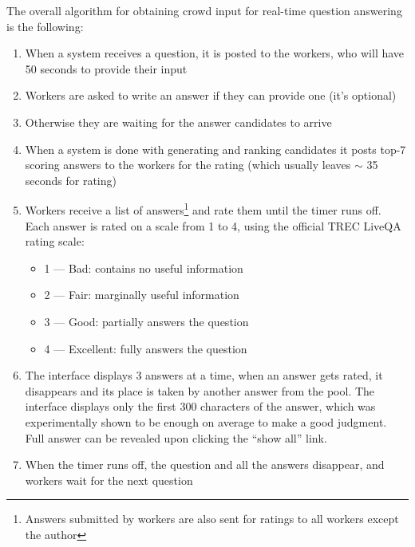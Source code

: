 The overall algorithm for obtaining crowd input for real-time question answering is the following:
\begin{enumerate}
\item When a system receives a question, it is posted to the workers, who will have 50 seconds to provide their input
\item Workers are asked to write an answer if they can provide one (it's optional)
\item Otherwise they are waiting for the answer candidates to arrive
\item When a system is done with generating and ranking candidates it posts top-7 scoring answers to the workers for the rating (which usually leaves $\sim$ 35 seconds for rating)
\item Workers receive a list of answers\footnote{Answers submitted by workers are also sent for ratings to all workers except the author} and rate them until the timer runs off. Each answer is rated on a scale from 1 to 4, using the official TREC LiveQA rating scale:
	\begin{itemize}
    \item 1 --- Bad: contains no useful information
    \item 2 --- Fair: marginally useful information
    \item 3 --- Good: partially answers the question
    \item 4 --- Excellent: fully answers the question
    \end{itemize}
\item The interface displays 3 answers at a time, when an answer gets rated, it disappears and its place is taken by another answer from the pool. The interface displays only the first 300 characters of the answer, which was experimentally shown to be enough on average to make a good judgment.
Full answer can be revealed upon clicking the ``show all'' link.
\item When the timer runs off, the question and all the answers disappear, and workers wait for the next question
\end{enumerate}

